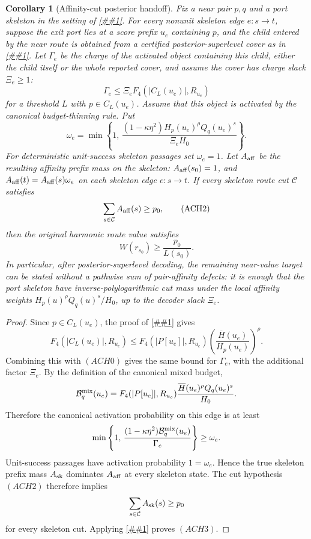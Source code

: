 \documentclass[10pt]{article}
\newcommand{\cref}[1]{\ref{##1}}
\newtheorem{corollary}[theorem]{Corollary}
\theoremstyle{definition}
\begin{document}
\begin{corollary}[Affinity-cut posterior handoff]
   \label{cor:affinity-cut-posterior-handoff}
   Fix a near pair \(p,q\) and a port skeleton in the setting of
   \cref{lem:port-skeleton-saturated-comparison}.  For every nonunit skeleton
   edge \(e:s\to t\), suppose the exit port lies at a score prefix \(u_e\)
   containing \(p\), and the child entered by the near route is obtained from a
   certified posterior-superlevel cover as in
   \cref{cor:certified-threshold-handoff}.  Let \(\Gamma_e\) be the charge of
   the activated object containing this child, either the child itself or the
   whole reported cover, and assume the cover has charge slack \(\Xi_e\ge1\):
   \[
      \Gamma_e\le \Xi_eF_4(|C_L(u_e)|,R_{u_e})
      \tag{ACH0}
   \]
   for a threshold \(L\) with \(p\in C_L(u_e)\).  Assume that this object is
   activated by the canonical budget-thinning rule.  Put
   \[
      \omega_e
      =
      \min\left\{
         1,\,
         \frac{(1-\kappa\eta^2)H_p(u_e)^\rho Q_q(u_e)^s}
              {\Xi_e H_0}
      \right\}.
      \tag{ACH1}
   \]
   For deterministic unit-success skeleton passages set \(\omega_e=1\).
   Let \(A_{\rm aff}\) be the resulting affinity prefix mass on the skeleton:
   \(A_{\rm aff}(s_0)=1\), and
   \(A_{\rm aff}(t)=A_{\rm aff}(s)\omega_e\) on each skeleton edge
   \(e:s\to t\).  If every skeleton route cut \(\mathcal C\) satisfies
   \[
      \sum_{s\in\mathcal C}A_{\rm aff}(s)\ge p_0,
      \tag{ACH2}
   \]
   then the original harmonic route value satisfies
   \[
      W(r_{s_0})\ge\frac{p_0}{L(s_0)}.
      \tag{ACH3}
   \]
   In particular, after posterior-superlevel decoding, the remaining
   near-value target can be stated without a pathwise sum of pair-affinity
   defects: it is enough that the port skeleton have inverse-polylogarithmic
   cut mass under the local affinity weights
   \(H_p(u)^\rho Q_q(u)^s/H_0\), up to the decoder slack \(\Xi_e\).
\end{corollary}

\begin{proof}
   Since \(p\in C_L(u_e)\), the proof of
   \cref{lem:posterior-superlevel-cancels-surprise} gives
   \[
      F_4(|C_L(u_e)|,R_{u_e})
      \le
      F_4(|P[u_e]|,R_{u_e})
      \left(\frac{\overline H(u_e)}{H_p(u_e)}\right)^\rho .
   \]
   Combining this with \((ACH0)\) gives the same bound for \(\Gamma_e\), with
   the additional factor \(\Xi_e\).
   By the definition of the canonical mixed budget,
   \[
      \mathcal B_q^{\rm mix}(u_e)
      =
      F_4(|P[u_e]|,R_{u_e})
      \frac{\overline H(u_e)^\rho Q_q(u_e)^s}{H_0}.
   \]
   Therefore the canonical activation probability on this edge is at least
   \[
      \min\left\{
         1,\,
         \frac{(1-\kappa\eta^2)\mathcal B_q^{\rm mix}(u_e)}
              {\Gamma_e}
      \right\}
      \ge
      \omega_e .
   \]
   Unit-success passages have activation probability \(1=\omega_e\).  Hence
   the true skeleton prefix mass \(A_{\rm sk}\) dominates \(A_{\rm aff}\) at
   every skeleton state.  The cut hypothesis \((ACH2)\) therefore implies
   \[
      \sum_{s\in\mathcal C}A_{\rm sk}(s)\ge p_0
   \]
   for every skeleton cut.  Applying
   \cref{cor:skeleton-cut-conductance} proves \((ACH3)\).
\end{proof}
\end{document}
